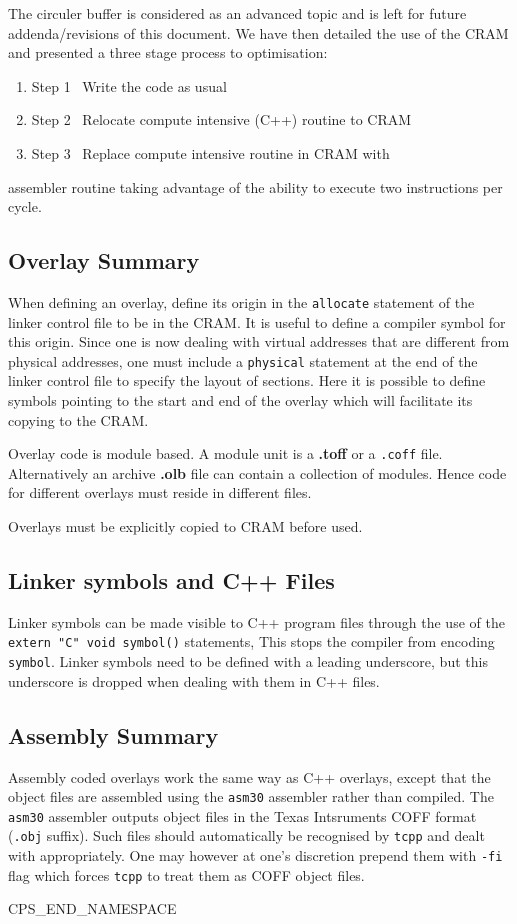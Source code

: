 The circuler buffer is considered as an advanced topic and is left
for future addenda/revisions of this document. We have then detailed
the use of the CRAM and presented a three stage process to optimisation:
\begin{enumerate}
\item{Step 1\ } Write the code as usual
\item{Step 2\ } Relocate compute intensive (C++) routine to CRAM
\item{Step 3\ } Replace compute intensive routine in CRAM with
\end{enumerate}
assembler routine taking advantage of the ability to execute two 
instructions per cycle.

\subsection{Overlay Summary}
When defining an overlay, define its origin in the {\tt allocate} statement
of the linker control file to be in the CRAM. It is useful to define
a compiler symbol for this origin. Since one is now  dealing with 
virtual addresses that are different from physical addresses, one must
include a {\tt physical} statement at the end of the linker control file
to specify the layout of sections. Here it is possible to define
symbols pointing to the start and end of the overlay which will facilitate
its copying to the CRAM.

Overlay code is module based. A module unit is a {\bf .toff} or a {\tt .coff}
file. Alternatively an archive {\bf .olb} file can contain a collection of 
modules. Hence code for different overlays must reside in different files.

Overlays must be explicitly copied to CRAM before used. 

\subsection{Linker symbols and C++ Files}
Linker symbols  can be made visible to C++
program files through the use of the {\tt extern "C" void symbol()} statements,
This stops the compiler from encoding {\tt symbol}. Linker symbols need
to be defined with a leading underscore, but this underscore is dropped
when dealing with them in C++ files.

\subsection{Assembly Summary}
Assembly coded  overlays work the same way as C++ overlays, except that the 
object files are assembled using the {\tt asm30} assembler rather than 
compiled. The {\tt asm30} assembler outputs object files in the Texas Intsruments COFF format ({\tt .obj} suffix). Such files should automatically be
recognised by {\tt tcpp} and dealt with appropriately. One may however
at one's discretion prepend them with {\tt -fi} flag which forces {\tt tcpp} 
to treat them as COFF object files.



CPS_END_NAMESPACE

